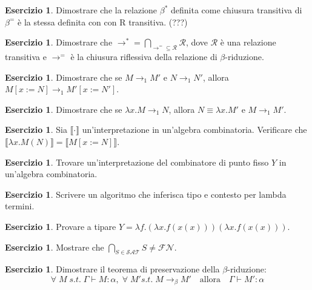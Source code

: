 \documentclass[oneside]{amsart}
\numberwithin{equation}{section}
\numberwithin{figure}{section}
\theoremstyle{plain}
\theoremstyle{definition}
\newtheorem{xca}[thm]{Esercizio}
\begin{document}
\begin{xca}
Dimostrare che la relazione $\beta^{*}$ definita come chiusura transitiva
di $\beta^{=}$ è la stessa definita con con R transitiva. (???)
\end{xca}

\begin{xca}
Dimostrare che $\rightarrow^{*} = \underset{\rightarrow^{=} \subseteq \mathcal{R}}{\bigcap} \mathcal{R}$,
dove $\mathcal{R}$ è una relazione transitiva e $\rightarrow^{=}$ è la chiusura riflessiva
della relazione di $\beta$-riduzione.
\end{xca}

\begin{xca}
Dimostrare che se $M \rightarrow_1 M'$ e $N \rightarrow_1 N'$, allora $M[x:=N] \rightarrow_1 M'[x:=N']$.
\end{xca}

\begin{xca}
Dimostrare che se ${\lambda}x.M \rightarrow_1 N$, allora
$N \equiv {\lambda}x.M'$ e $M \rightarrow_1 M'$.
\end{xca}

\begin{xca}
Sia $\llbracket\cdot\rrbracket$ un'interpretazione in un'algebra combinatoria. Verificare
che $\llbracket {\lambda}x.M(N) \rrbracket = \llbracket M[x:=N] \rrbracket$.
\end{xca}

\begin{xca}
Trovare un'interpretazione del combinatore di punto fisso $Y$ in un'algebra combinatoria.
\end{xca}

\begin{xca}
Scrivere un algoritmo che inferisca tipo e contesto per lambda termini.
\end{xca}

\begin{xca}
Provare a tipare $Y = \lambda f.(\lambda x.f(x(x)))(\lambda x.f(x(x)))$.
\end{xca}

\begin{xca}
Mostrare che $\underset{S \in \mathcal{SAT}}{\bigcap}S \neq \mathcal{FN}$.
\end{xca}

\begin{xca}
Dimostrare il teorema di preservazione della $\beta$-riduzione:
\[ \forall \; M \; s.t. \; {\Gamma \vdash M:\alpha}, \; \forall \;
M' s.t. \; M\rightarrow_\beta M' \quad\text{allora}\quad \Gamma \vdash M':\alpha \]
\end{xca}
\end{document}
